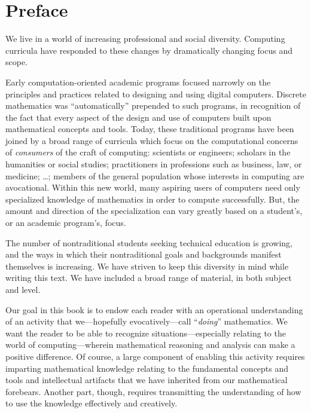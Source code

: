 
\chapter*{Preface}

We live in a world of increasing professional and social diversity.
Computing curricula have responded to these changes by dramatically
changing focus and scope.

Early computation-oriented academic programs focused narrowly on the
principles and practices related to designing and using digital
computers.  Discrete mathematics was ``automatically'' prepended to
such programs, in recognition of the fact that every aspect of the
design and use of computers built upon mathematical concepts and
tools.  Today, these traditional programs have been joined by a broad
range of curricula which focus on the computational concerns of {\em
  consumers} of the craft of computing: scientists or engineers;
scholars in the humanities or social studies; practitioners in
professions such as business, law, or medicine; \ldots; members of the
general population whose interests in computing are avocational.
Within this new world, many aspiring users of computers need only
specialized knowledge of mathematics in order to compute successfully.
But, the amount and direction of the specialization can vary greatly
based on a student's, or an academic program's, focus.

\medskip

The number of nontraditional students seeking technical education is
growing, and the ways in which their nontraditional goals and
backgrounds manifest themselves is increasing.  We have striven to
keep this diversity in mind while writing this text.  We have included
a broad range of material, in both subject and level.

\bigskip

Our goal in this book is to endow each reader with an operational
understanding of an activity that we---hopefully evocatively---call
``{\em doing}'' mathematics.  We want the reader to be able to
recognize situations---especially relating to the world of
computing---wherein mathematical reasoning and analysis can make a
positive difference.  Of course, a large component of enabling this
activity requires imparting mathematical knowledge relating to the
fundamental concepts and tools and intellectual artifacts that we have
inherited from our mathematical forebears.  Another part, though,
requires transmitting the understanding of how to use the knowledge
effectively and creatively.

